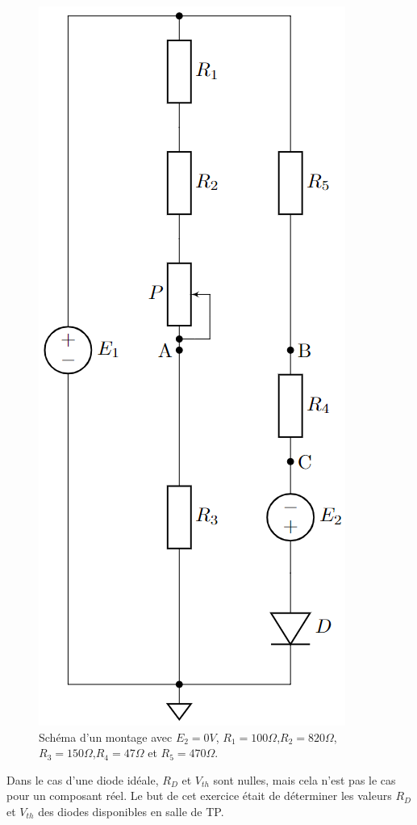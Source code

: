 \begin{figure}[H]
    \begin{center}
        \includegraphics*[scale=0.5]{images/3.png}
        \caption{\label{figure 3} Schéma d'un montage avec $E_2=0V$, $R_1 = 100\Omega$,$R_2=820\Omega$,$R_3=150\Omega$,$R_4=47\Omega$ et $R_5=470\Omega$.}
    \end{center}
\end{figure}

Dans le cas d’une diode idéale, $R_D$ et $V_{th}$ sont nulles, mais cela n’est pas le cas pour un composant réel.
Le but de cet exercice était de déterminer les valeurs $R_D$ et $V_{th}$ des diodes disponibles en salle de TP.
\\

